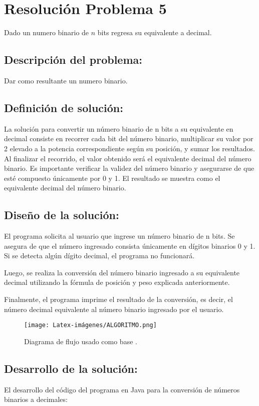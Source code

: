 \section{Resolución Problema 5}
Dado un numero binario de $n$ bits regresa su equivalente a decimal.


\subsection{\textbf{Descripción del problema:}}

Dar como resultante un numero binario.

\subsection{\textbf{Definición de solución:}}
La solución para convertir un número binario de n bits a su equivalente en decimal consiste en recorrer cada bit del número binario, multiplicar su valor por 2 elevado a la potencia correspondiente según su posición, y sumar los resultados. Al finalizar el recorrido, el valor obtenido será el equivalente decimal del número binario. Es importante verificar la validez del número binario y asegurarse de que esté compuesto únicamente por 0 y 1. El resultado se muestra como el equivalente decimal del número binario.


\subsection{\textbf{Diseño de la solución:}}
El programa solicita al usuario que ingrese un número binario de n bits. Se asegura de que el número ingresado consista únicamente en dígitos binarios 0 y 1. Si se detecta algún dígito decimal, el programa no funcionará.

Luego, se realiza la conversión del número binario ingresado a su equivalente decimal utilizando la fórmula de posición y peso explicada anteriormente.

Finalmente, el programa imprime el resultado de la conversión, es decir, el número decimal equivalente al número binario ingresado por el usuario.


\begin{figure}[H]
    \centering
    \texttt{[image: Latex-imágenes/ALGORITMO.png]}
    \caption{Diagrama de flujo usado como base .}
\end{figure}


\subsection{\textbf{Desarrollo de la solución:}}
El desarrollo del código del programa en Java para la conversión de números binarios a decimales:

